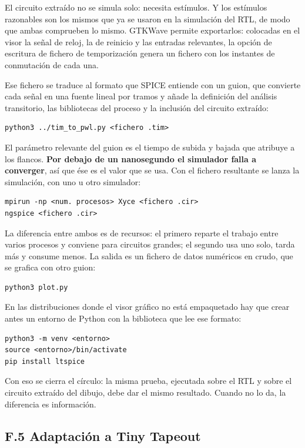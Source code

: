 El circuito extraído no se simula solo: necesita estímulos. Y los
estímulos razonables son los mismos que ya se usaron en la simulación
del RTL, de modo que ambas comprueben lo mismo. GTKWave permite
exportarlos: colocadas en el visor la señal de reloj, la de reinicio y
las entradas relevantes, la opción de escritura de fichero de
temporización genera un fichero con los instantes de conmutación de cada
una.

Ese fichero se traduce al formato que SPICE entiende con un guion, que
convierte cada señal en una fuente lineal por tramos y añade la
definición del análisis transitorio, las bibliotecas del proceso y la
inclusión del circuito extraído:

\begin{verbatim}
python3 ../tim_to_pwl.py <fichero .tim>
\end{verbatim}

El parámetro relevante del guion es el tiempo de subida y bajada que
atribuye a los flancos. \textbf{Por debajo de un nanosegundo el
simulador falla a converger}, así que ése es el valor que se usa. Con el
fichero resultante se lanza la simulación, con uno u otro simulador:

\begin{verbatim}
mpirun -np <num. procesos> Xyce <fichero .cir>
ngspice <fichero .cir>
\end{verbatim}

La diferencia entre ambos es de recursos: el primero reparte el trabajo
entre varios procesos y conviene para circuitos grandes; el segundo usa
uno solo, tarda más y consume menos. La salida es un fichero de datos
numéricos en crudo, que se grafica con otro guion:

\begin{verbatim}
python3 plot.py
\end{verbatim}

En las distribuciones donde el visor gráfico no está empaquetado hay que
crear antes un entorno de Python con la biblioteca que lee ese formato:

\begin{verbatim}
python3 -m venv <entorno>
source <entorno>/bin/activate
pip install ltspice
\end{verbatim}

Con eso se cierra el círculo: la misma prueba, ejecutada sobre el RTL y
sobre el circuito extraído del dibujo, debe dar el mismo resultado.
Cuando no lo da, la diferencia es información.

\subsection{F.5 Adaptación a Tiny
Tapeout}\label{f.5-adaptaciuxf3n-a-tiny-tapeout}

